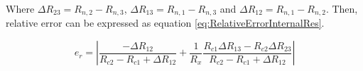 Where $\Delta R_{23}=R_{n,2}-R_{n,3}$, $\Delta R_{13}=R_{n,1}-R_{n,3}$ and $\Delta R_{12}=R_{n,1}-R_{n,2}$. Then, relative error can be expressed as equation \eqref{eq:RelativeErrorInternalRes}.

\begin{equation}
\label{eq:RelativeErrorInternalRes}
e_{r} = \left|\frac{-\Delta R_{12}}{R_{c2}-R_{c1}+\Delta R_{12}}+\frac{1}{R_{x}}\frac{R_{c1}\Delta R_{13}-R_{c2}\Delta R_{23}}{R_{c2}-R_{c1}+\Delta R_{12}}\right|
\end{equation}
